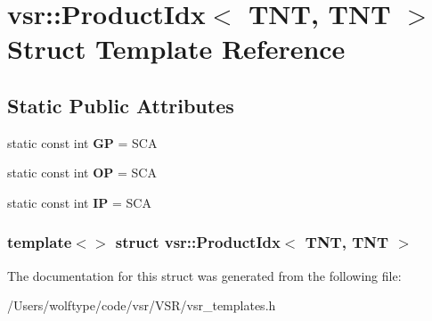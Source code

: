 \hypertarget{structvsr_1_1_product_idx_3_01_t_n_t_00_01_t_n_t_01_4}{\section{vsr\-:\-:Product\-Idx$<$ T\-N\-T, T\-N\-T $>$ Struct Template Reference}
\label{structvsr_1_1_product_idx_3_01_t_n_t_00_01_t_n_t_01_4}
}
\subsection*{Static Public Attributes}
\begin{DoxyCompactItemize}
\item 
\hypertarget{structvsr_1_1_product_idx_3_01_t_n_t_00_01_t_n_t_01_4_a9deef60eb9233b3f0dc440d8733315c0}{static const int {\bfseries G\-P} = S\-C\-A}\label{structvsr_1_1_product_idx_3_01_t_n_t_00_01_t_n_t_01_4_a9deef60eb9233b3f0dc440d8733315c0}

\item 
\hypertarget{structvsr_1_1_product_idx_3_01_t_n_t_00_01_t_n_t_01_4_afcb26eef15af33ee56cca50dfbec7eaf}{static const int {\bfseries O\-P} = S\-C\-A}\label{structvsr_1_1_product_idx_3_01_t_n_t_00_01_t_n_t_01_4_afcb26eef15af33ee56cca50dfbec7eaf}

\item 
\hypertarget{structvsr_1_1_product_idx_3_01_t_n_t_00_01_t_n_t_01_4_a2b8b799895e12ee24095cf38e219e9a0}{static const int {\bfseries I\-P} = S\-C\-A}\label{structvsr_1_1_product_idx_3_01_t_n_t_00_01_t_n_t_01_4_a2b8b799895e12ee24095cf38e219e9a0}

\end{DoxyCompactItemize}
\subsubsection*{template$<$$>$ struct vsr\-::\-Product\-Idx$<$ T\-N\-T, T\-N\-T $>$}



The documentation for this struct was generated from the following file\-:\begin{DoxyCompactItemize}
\item 
/\-Users/wolftype/code/vsr/\-V\-S\-R/vsr\-\_\-templates.\-h\end{DoxyCompactItemize}
